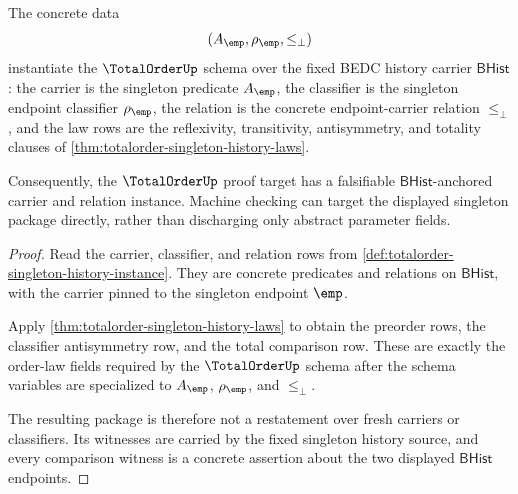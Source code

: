 \begin{theorem}
\label{thm:totalorder-singleton-schema-instantiated}
The concrete data
$$
(A_{\emp},\rho_{\emp},\le_{\bot})
$$
instantiate the $\TotalOrderUp$ schema over the fixed BEDC history carrier
$\mathsf{BHist}$: the carrier is the singleton predicate $A_{\emp}$, the
classifier is the singleton endpoint classifier $\rho_{\emp}$, the relation is
the concrete endpoint-carrier relation $\le_{\bot}$, and the law rows are the
reflexivity, transitivity, antisymmetry, and totality clauses of
\autoref{thm:totalorder-singleton-history-laws}.

Consequently, the $\TotalOrderUp$ proof target has a falsifiable
$\mathsf{BHist}$-anchored carrier and relation instance. Machine checking can
target the displayed singleton package directly, rather than discharging only
abstract parameter fields.
\end{theorem}
\begin{proof}
Read the carrier, classifier, and relation rows from
\autoref{def:totalorder-singleton-history-instance}. They are concrete
predicates and relations on $\mathsf{BHist}$, with the carrier pinned to the
singleton endpoint $\emp$.

Apply \autoref{thm:totalorder-singleton-history-laws} to obtain the preorder
rows, the classifier antisymmetry row, and the total comparison row. These are
exactly the order-law fields required by the $\TotalOrderUp$ schema after the
schema variables are specialized to $A_{\emp}$, $\rho_{\emp}$, and
$\le_{\bot}$.

The resulting package is therefore not a restatement over fresh carriers or
classifiers. Its witnesses are carried by the fixed singleton history source,
and every comparison witness is a concrete assertion about the two displayed
$\mathsf{BHist}$ endpoints.
\end{proof}

